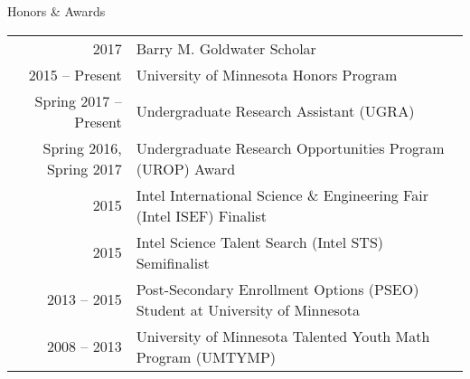 \begin{rSection}{Honors \& Awards}

  \begin{tabularx}{\linewidth}{r|X}
    2017 & Barry M. Goldwater Scholar \\
    2015 -- Present & University of Minnesota Honors Program \\
    Spring 2017 -- Present & Undergraduate Research Assistant (UGRA) \\
    Spring 2016, Spring 2017 & Undergraduate Research Opportunities Program (UROP) Award \\
    2015 & Intel International Science \& Engineering Fair (Intel ISEF) Finalist \\
    2015 & Intel Science Talent Search (Intel STS) Semifinalist \\
    2013 -- 2015 & Post-Secondary Enrollment Options (PSEO) Student at University of Minnesota\\
    2008 -- 2013 & University of Minnesota Talented Youth Math Program (UMTYMP)
  \end{tabularx}
\end{rSection}
